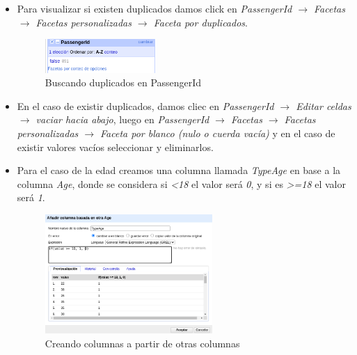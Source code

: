 \documentclass[12pt]{article}
\begin{document}
\begin{itemize}
                    \item Para visualizar si existen duplicados damos click en \textit{PassengerId $\rightarrow$ Facetas $\rightarrow$ Facetas personalizadas $\rightarrow$  Faceta por duplicados}.
                        \begin{figure}[!h]
                            \centering
                            \includegraphics[width=0.4\textwidth]{img/openrefine-21.png}
                            \caption{Buscando duplicados en PassengerId}
                        \end{figure}
                    
                    \item En el caso de existir duplicados, damos cliec en \textit{PassengerId $\rightarrow$ Editar celdas $\rightarrow$ vaciar hacia abajo}, luego en \textit{PassengerId $\rightarrow$ Facetas $\rightarrow$ Facetas personalizadas $\rightarrow$ Faceta por blanco (nulo o cuerda vacía)} y en el caso de existir valores vacíos seleccionar y eliminarlos.
                    \item Para el caso de la edad creamos una columna llamada \textit{TypeAge} en base a la columna \textit{Age}, donde se considera si \textit{<18} el valor será \textit{0}, y si es \textit{>=18} el valor será \textit{1}.
                        \begin{figure}[!h]
                            \centering
                            \includegraphics[width=0.6\textwidth]{img/openrefine-22.png}
                            \caption{Creando columnas a partir de otras columnas}
                        \end{figure}
                    

\end{itemize}
\end{document}
